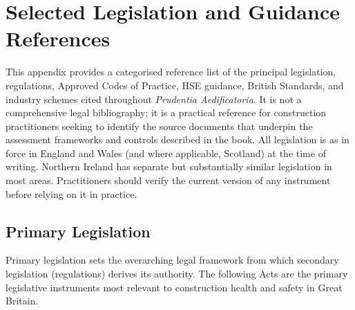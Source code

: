 \chapter{Selected Legislation and Guidance References}
\label{chap:Selected Legislation and Guidance References}

This appendix provides a categorised reference list of the principal legislation, regulations, Approved Codes of Practice, HSE guidance, British Standards, and industry schemes cited throughout \textit{Prudentia Aedificatoria}. It is not a comprehensive legal bibliography; it is a practical reference for construction practitioners seeking to identify the source documents that underpin the assessment frameworks and controls described in the book. All legislation is as in force in England and Wales (and where applicable, Scotland) at the time of writing. Northern Ireland has separate but substantially similar legislation in most areas. Practitioners should verify the current version of any instrument before relying on it in practice.

\section{Primary Legislation}

Primary legislation sets the overarching legal framework from which secondary legislation (regulations) derives its authority. The following Acts are the primary legislative instruments most relevant to construction health and safety in Great Britain.

